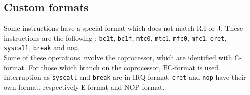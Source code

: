 \subsection{Custom formats}

	Some instructions have a special format which does not match R,I or J. These instructions are the following : \verb?bc1t?, \verb?bc1f?, \verb?mtc0?, \verb?mtc1?, \verb?mfc0?, \verb?mfc1?, \verb?eret?, \verb?syscall?, \verb?break? and \verb?nop?.\\
	
	 Some of these operations involve the coprocessor, which are identified with C-format. For those which branch on the coprocessor, BC-format is used. Interruption as \verb?syscall? and \verb?break? are in IRQ-format. \verb?eret? and \verb?nop? have their own format, respectively E-format and NOP-format.




